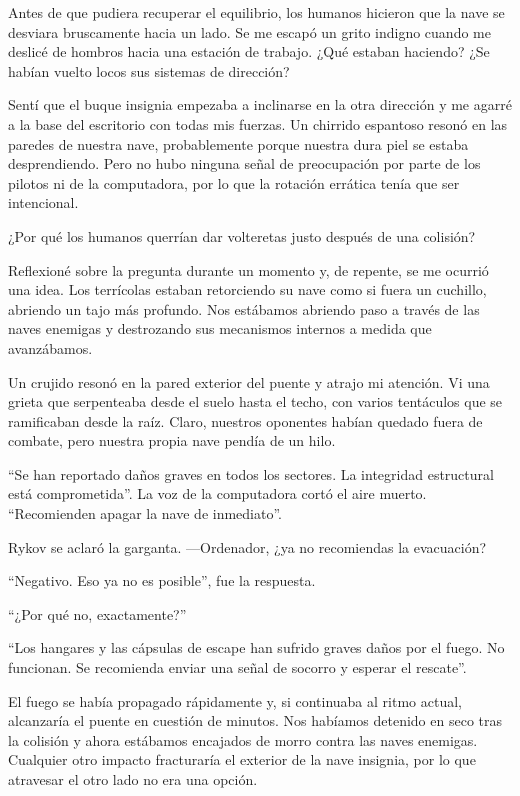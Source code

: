 Antes de que pudiera recuperar el equilibrio, los humanos hicieron que la nave se desviara bruscamente hacia un lado. Se me escapó un grito indigno cuando me deslicé de hombros hacia una estación de trabajo. ¿Qué estaban haciendo? ¿Se habían vuelto locos sus sistemas de dirección?

Sentí que el buque insignia empezaba a inclinarse en la otra dirección y me agarré a la base del escritorio con todas mis fuerzas. Un chirrido espantoso resonó en las paredes de nuestra nave, probablemente porque nuestra dura piel se estaba desprendiendo. Pero no hubo ninguna señal de preocupación por parte de los pilotos ni de la computadora, por lo que la rotación errática tenía que ser intencional.

¿Por qué los humanos querrían dar volteretas justo después de una colisión?

Reflexioné sobre la pregunta durante un momento y, de repente, se me ocurrió una idea. Los terrícolas estaban retorciendo su nave como si fuera un cuchillo, abriendo un tajo más profundo. Nos estábamos abriendo paso a través de las naves enemigas y destrozando sus mecanismos internos a medida que avanzábamos.

Un crujido resonó en la pared exterior del puente y atrajo mi atención. Vi una grieta que serpenteaba desde el suelo hasta el techo, con varios tentáculos que se ramificaban desde la raíz. Claro, nuestros oponentes habían quedado fuera de combate, pero nuestra propia nave pendía de un hilo.

``Se han reportado daños graves en todos los sectores. La integridad estructural está comprometida''. La voz de la computadora cortó el aire muerto. ``Recomienden apagar la nave de inmediato''.

Rykov se aclaró la garganta. —Ordenador, ¿ya no recomiendas la evacuación?

``Negativo. Eso ya no es posible'', fue la respuesta.

``¿Por qué no, exactamente?''


``Los hangares y las cápsulas de escape han sufrido graves daños por el fuego. No funcionan. Se recomienda enviar una señal de socorro y esperar el rescate''.

El fuego se había propagado rápidamente y, si continuaba al ritmo actual, alcanzaría el puente en cuestión de minutos. Nos habíamos detenido en seco tras la colisión y ahora estábamos encajados de morro contra las naves enemigas. Cualquier otro impacto fracturaría el exterior de la nave insignia, por lo que atravesar el otro lado no era una opción.

